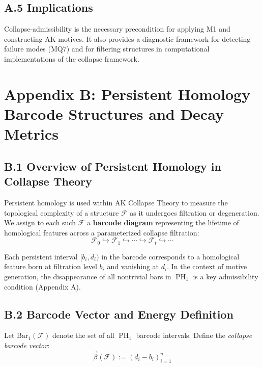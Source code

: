 \documentclass[11pt]{article}
\DeclareMathOperator{\PH}{PH}
\begin{document}
\subsection*{A.5 Implications}

Collapse-admissibility is the necessary precondition for applying M1 and constructing AK motives. It also provides a diagnostic framework for detecting failure modes (MQ7) and for filtering structures in computational implementations of the collapse framework.

\FloatBarrier




\section*{Appendix B: Persistent Homology Barcode Structures and Decay Metrics}

\subsection*{B.1 Overview of Persistent Homology in Collapse Theory}

Persistent homology is used within AK Collapse Theory to measure the topological complexity of a structure $\mathcal{F}$ as it undergoes filtration or degeneration. We assign to each such $\mathcal{F}$ a \textbf{barcode diagram} representing the lifetime of homological features across a parameterized collapse filtration:
\[
\mathcal{F}_0 \hookrightarrow \mathcal{F}_1 \hookrightarrow \cdots \hookrightarrow \mathcal{F}_t \hookrightarrow \cdots
\]

Each persistent interval $[b_i, d_i)$ in the barcode corresponds to a homological feature born at filtration level $b_i$ and vanishing at $d_i$. In the context of motive generation, the disappearance of all nontrivial bars in $\PH_1$ is a key admissibility condition (Appendix A).

\subsection*{B.2 Barcode Vector and Energy Definition}

Let $\mathrm{Bar}_1(\mathcal{F})$ denote the set of all $\PH_1$ barcode intervals. Define the \emph{collapse barcode vector}:
\[
\vec{\beta}(\mathcal{F}) := \left( d_i - b_i \right)_{i=1}^n
\]
\end{document}
